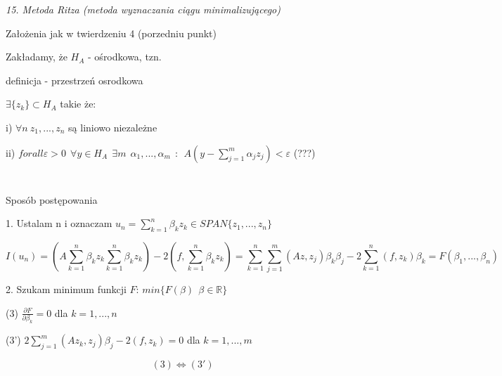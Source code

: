 \textit{15. Metoda Ritza (metoda wyznaczania ciągu minimalizującego)}

Założenia jak w twierdzeniu 4 (porzedniu punkt)

Zakładamy, że $H_A$ - ośrodkowa, tzn.

definicja - przestrzeń osrodkowa

$\exists \{z_k\} \subset H_A$ takie że:

i) $\forall n\ z_1, ..., z_n$ są liniowo niezależne

ii) $forall \varepsilon > 0\ \ \forall y \in H_A \ \ \exists m\ \ \alpha _1, ..., \alpha _m\ \ : \ \ A(y - \sum_{j=1}^{m} \alpha _j z_j) < \varepsilon$ (???)

$\ $

$\ $

Sposób postępowania

1. Ustalam n i oznaczam $u_n = \sum_{k=1}^{n} \beta _k z_k \in SPAN\{z_1, ..., z_n\}$

\[ I(u_n) = (A\sum_{k=1}^{n} \beta _k z_k \sum_{k=1}^{n} \beta _k z_k) - 2(f, \sum_{k=1}^{n} \beta _k z_k) = \sum_{k=1}^{n}\sum_{j=1}^{m} (Az,z_j) \beta _k \beta _j - 2\sum_{k=1}^{n} (f, z_k) \beta _k = F(\beta _1, ..., \beta _n)\]

2. Szukam minimum funkcji $F$: $min\{F(\beta)\ \ \beta \in \mathbb{R}\}$

(3) $\frac{\partial F}{\partial \beta _k} = 0$ dla $k = 1,...,n$

(3') $2 \sum_{j=1}^{m} (Az_k, z_j) \beta _j - 2(f, z_k) = 0$ dla $k = 1,...,m$

\[ (3) \Leftrightarrow (3') \]